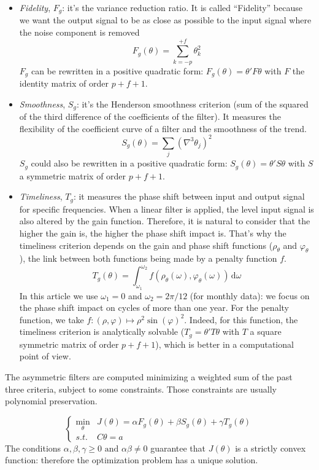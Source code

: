 \documentclass[
  12pt,
  ,
  a4paper]{article}
\newcommand\1{\mathds{1}}
\newcommand\ud{\,\mathrm{d}}
\begin{document}
\begin{itemize}
\item
  \emph{Fidelity}, \(F_g\): it's the variance reduction ratio. It is called ``Fidelity'' because we want the output signal to be as close as possible to the input signal where the noise component is removed
  \[
  F_g(\theta) = \sum_{k=-p}^{+f}\theta_{k}^{2}
  \]
  \(F_g\) can be rewritten in a positive quadratic form: \(F_g(\theta)=\theta'F\theta\) with \(F\) the identity matrix of order \(p+f+1\).
\item
  \emph{Smoothness}, \(S_g\): it's the Henderson smoothness criterion (sum of the squared of the third difference of the coefficients of the filter).
  It measures the flexibility of the coefficient curve of a filter and the smoothness of the trend.
  \[
  S_g(\theta) = \sum_{j}(\nabla^{3}\theta_{j})^{2}
  \]
  \(S_g\) could also be rewritten in a positive quadratic form: \(S_g(\theta)=\theta'S\theta\) with \(S\) a symmetric matrix of order \(p+f+1\).
\item
  \emph{Timeliness}, \(T_g\): it measures the phase shift between input and output signal for specific frequencies.
  When a linear filter is applied, the level input signal is also altered by the gain function.
  Therefore, it is natural to consider that the higher the gain is, the higher the phase shift impact is.
  That's why the timeliness criterion depends on the gain and phase shift functions (\(\rho_\theta\) and \(\varphi_{\theta}\)), the link between both functions being made by a penalty function \(f\).
  \[
  T_g(\theta)=\int_{\omega_{1}}^{\omega_{2}}f(\rho_{\theta}(\omega),\varphi_{\theta}(\omega))\ud\omega
  \]
  In this article we use \(\omega_1=0\) and \(\omega_2=2\pi/12\) (for monthly data): we focus on the phase shift impact on cycles of more than one year.
  For the penalty function, we take \(f\colon(\rho,\varphi)\mapsto\rho^2\sin(\varphi)^2\).
  Indeed, for this function, the timeliness criterion is analytically solvable (\(T_g=\theta'T\theta\) with \(T\) a square symmetric matrix of order \(p+f+1\)), which is better in a computational point of view.
\end{itemize}

The asymmetric filters are computed minimizing a weighted sum of the past three criteria, subject to some constraints. Those constraints are usually polynomial preservation.

\[
\begin{cases}
\underset{\theta}{\min} & J(\theta)=
\alpha F_g(\theta)+\beta S_g(\theta)+\gamma T_g(\theta)\\
s.t. & C\theta=a
\end{cases}
\]
The conditions \(\alpha,\beta,\gamma\geq 0\text{ and }\alpha\beta\ne 0\) guarantee that \(J(\theta)\) is a strictly convex function: therefore the optimization problem has a unique solution.
\end{document}

